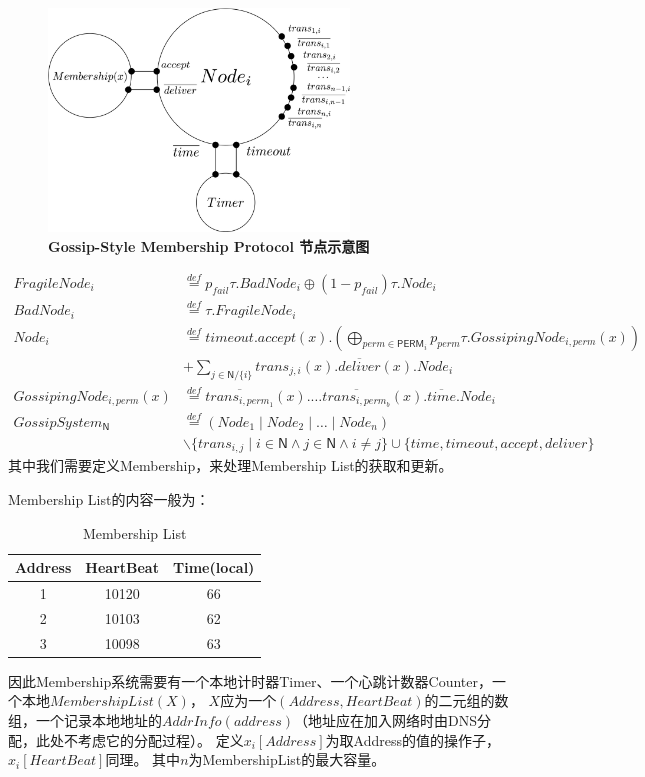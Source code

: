 \begin{figure}[!htbp]
	\small
	\centering
	\includegraphics[width=8cm]{../figure/Node_membership.png}
    \caption{\textbf{Gossip-Style Membership Protocol 节点示意图}}
    \label{fig_membership_node}
\end{figure}
\begin{align*}
    FragileNode_i&\stackrel{def}{=}p_{fail}\tau.BadNode_i\oplus (1-p_{fail})\tau.Node_i\\
    BadNode_i&\stackrel{def}{=}\tau.FragileNode_i\\
    Node_i&\stackrel{def}{=}timeout.accept(x).(\bigoplus_{perm\in \mathsf{PERM}_i} p_{perm}\tau.GossipingNode_{i,perm}(x))\\
     &+\sum_{j\in \mathsf{N}/\{i\}}trans_{j,i}(x).\overline{deliver}(x).Node_i\\
    GossipingNode_{i,perm}(x)&\stackrel{def}{=}\overline{trans_{i,perm_{1}}}(x).\dots \overline{trans_{i,perm_{b}}}(x).\overline{time}.Node_i\\
    GossipSystem_\mathsf{N}&\stackrel{def}{=}(Node_1\mid Node_2\mid \dots \mid Node_n)\\
    &\backslash \{trans_{i,j}\mid i\in \mathsf{N} \wedge j\in \mathsf{N} \wedge i\neq j\}\cup \{time, timeout, accept, deliver\}
 \end{align*}
 其中我们需要定义Membership，来处理Membership List的获取和更新。

Membership List的内容一般为：
\begin{table}[!hpt]
    \caption[Membership List]{Membership List\footnotemark}
    \label{tab:secondone}
    \centering
    \begin{tabular}{@{}ccc@{}} \toprule
      Address & HeartBeat & Time(local) \\ \midrule
      1 & 10120 & 66\\
      2 & 10103 & 62\\
      3 & 10098 & 63\\ \bottomrule
    \end{tabular}
  \end{table}
因此Membership系统需要有一个本地计时器Timer、一个心跳计数器Counter，一个本地$MembershipList(X)$，
$X$应为一个$(Address, HeartBeat)$的二元组的数组，一个记录本地地址的$AddrInfo(address)$（地址应在加入网络时由DNS分配，此处不考虑它的分配过程）。
定义$x_i[Address]$为取Address的值的操作子，$x_i[HeartBeat]$同理。
其中$n$为MembershipList的最大容量。

